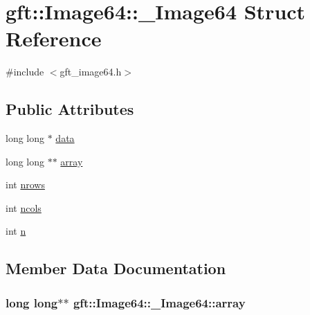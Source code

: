 \hypertarget{structgft_1_1Image64_1_1__Image64}{}\section{gft\+:\+:Image64\+:\+:\+\_\+\+Image64 Struct Reference}
\label{structgft_1_1Image64_1_1__Image64}


{\ttfamily \#include $<$gft\+\_\+image64.\+h$>$}

\subsection*{Public Attributes}
\begin{DoxyCompactItemize}
\item 
long long $\ast$ \hyperlink{structgft_1_1Image64_1_1__Image64_a0c78dfc1f22f84c7c1dc854d0e33bbc0}{data}
\item 
long long $\ast$$\ast$ \hyperlink{structgft_1_1Image64_1_1__Image64_a5a8005455e45847975759eb51412d340}{array}
\item 
int \hyperlink{structgft_1_1Image64_1_1__Image64_a80d241238b4a992e8429517ab9725397}{nrows}
\item 
int \hyperlink{structgft_1_1Image64_1_1__Image64_a7425ad4e26726e6472acbe75e1ea9290}{ncols}
\item 
int \hyperlink{structgft_1_1Image64_1_1__Image64_a7fdc0d8158f088dc04bf35e3039d449f}{n}
\end{DoxyCompactItemize}


\subsection{Member Data Documentation}
\subsubsection[{\texorpdfstring{array}{array}}]{\setlength{\rightskip}{0pt plus 5cm}long long$\ast$$\ast$ gft\+::\+Image64\+::\+\_\+\+Image64\+::array}\hypertarget{structgft_1_1Image64_1_1__Image64_a5a8005455e45847975759eb51412d340}{}\label{structgft_1_1Image64_1_1__Image64_a5a8005455e45847975759eb51412d340}
